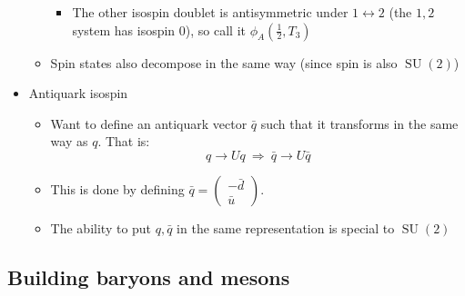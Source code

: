 \documentclass[11pt]{article}
\newcommand{\ubar}{\bar{u}}
\newcommand{\qbar}{{\bar{q}}}
\newcommand{\dbar}{\bar{d}}
\DeclareMathOperator{\SU}{SU}
\newcommand{\thus}{\ensuremath{~\Rightarrow~}}
\begin{document}
\begin{itemize}
\begin{itemize}
\begin{itemize}
      \item The other isospin doublet is antisymmetric under $1\leftrightarrow2$ (the $1,2$ system has isospin $0$), so call it $\phi_A\left(\frac{1}{2},T_3\right)$
    \end{itemize}
    \item Spin states also decompose in the same way (since spin is also $\SU(2)$)
  \end{itemize}
  \item Antiquark isospin
  \begin{itemize}
    \item Want to define an antiquark vector $\qbar$ such that it transforms in the same way as $q$. That is:
    \begin{equation}
      q \rightarrow U q\thus \qbar \rightarrow U \qbar
    \end{equation}
    \item This is done by defining $\qbar = \begin{pmatrix} - \dbar \\ \ubar \end{pmatrix}$.
    \item The ability to put $q,\qbar$ in the same representation is special to $\SU(2)$
  \end{itemize}
\end{itemize}

\subsection{Building baryons and mesons}
\end{document}
